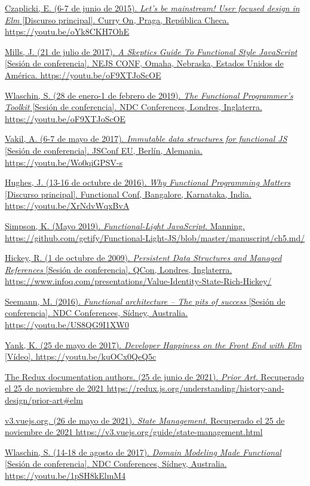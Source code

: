 \documentclass{article}
\newcommand{\aparef}[2]{\href{#1}{#2 #1}}
\begin{document}
\begin{thebibliography}{99}
 \href{https://youtu.be/oYk8CKH7OhE}{Czaplicki, E. (6-7 de junio de 2015). \textit{Let's be mainstream! User focused design in Elm} [Discurso principal]. Curry On, Praga, República Checa. https://youtu.be/oYk8CKH7OhE}

 \href{https://youtu.be/oF9XTJoScOE}{Mills, J. (21 de julio de 2017). \textit{A Skeptics Guide To Functional Style JavaScript} [Sesión de conferencia]. NEJS CONF, Omaha, Nebraska, Estados Unidos de América. https://youtu.be/oF9XTJoScOE}

 \href{https://youtu.be/Nrp_LZ-XGsY}{Wlaschin, S. (28 de enero-1 de febrero de 2019). \textit{The Functional Programmer's Toolkit} [Sesión de conferencia]. NDC Conferences, Londres, Inglaterra. https://youtu.be/oF9XTJoScOE}

 \aparef{https://youtu.be/Wo0qiGPSV-s}{Vakil, A. (6-7 de mayo de 2017). \textit{Immutable data structures for functional JS} [Sesión de conferencia]. JSConf EU, Berlín, Alemania.}

 \aparef{https://youtu.be/XrNdvWqxBvA}{Hughes, J. (13-16 de octubre de 2016). \textit{Why Functional Programming Matters} [Discurso principal]. Functional Conf, Bangalore, Karnataka, India.}

 \aparef{https://github.com/getify/Functional-Light-JS/blob/master/manuscript/ch5.md/}{Simpson, K. (Mayo 2019). \textit{Functional-Light JavaScript}. Manning.}

 \aparef{https://www.infoq.com/presentations/Value-Identity-State-Rich-Hickey/}{Hickey, R. (1 de octubre de 2009). \textit{Persistent Data Structures and Managed References} [Sesión de conferencia]. QCon, Londres, Inglaterra.}

 \aparef{https://youtu.be/US8QG9I1XW0}{Seemann, M. (2016). \textit{Functional architecture – The pits of success} [Sesión de conferencia]. NDC Conferences, Sídney, Australia.}

 \aparef{https://youtu.be/kuOCx0QeQ5c}{Yank, K. (25 de mayo de 2017). \textit{Developer Happiness on the Front End with Elm} [Vídeo].}

 \aparef{https://redux.js.org/understanding/history-and-design/prior-art\#elm}{The Redux documentation authors. (25 de junio de 2021). \textit{Prior Art}. Recuperado el 25 de noviembre de 2021}

 \aparef{https://v3.vuejs.org/guide/state-management.html}{v3.vuejs.org. (26 de mayo de 2021). \textit{State Management}. Recuperado el 25 de noviembre de 2021}

 \aparef{https://youtu.be/1pSH8kElmM4}{Wlaschin, S. (14-18 de agosto de 2017). \textit{Domain Modeling Made Functional} [Sesión de conferencia]. NDC Conferences, Sídney, Australia.}

\end{thebibliography}
\end{document}

